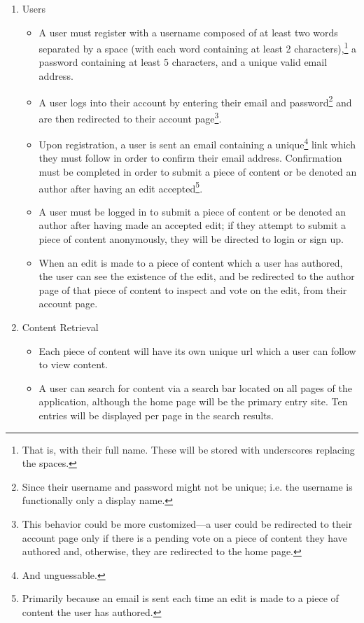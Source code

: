 \documentclass[12pt,letterpaper]{article}
\begin{document}
\begin{enumerate}
\item[] Users
\begin{itemize}
\item A user must register with a username composed of at least two words separated by a space (with each word containing at least 2 characters),\footnote{That is, with their full name. These will be stored with underscores replacing the spaces.} a password containing at least 5 characters, and a unique valid email address.  
\item A user logs into their account by entering their email and password\footnote{Since their username and password might not be unique; i.e. the username is functionally only a display name.} and are then redirected to their account page\footnote{This behavior could be more customized---a user could be redirected to their account page only if there is a pending vote on a piece of content they have authored and, otherwise, they are redirected to the home page.}.
\item Upon registration, a user is sent an email containing a unique\footnote{And unguessable.} link which they must follow in order to confirm their email address. Confirmation must be completed in order to submit a piece of content or be denoted an author after having an edit accepted\footnote{Primarily because an email is sent each time an edit is made to a piece of content the user has authored.}.
\item A user must be logged in to submit a piece of content or be denoted an author after having made an accepted edit; if they attempt to submit a piece of content anonymously, they will be directed to login or sign up. 
\item When an edit is made to a piece of content which a user has authored, the user can see the existence of the edit, and be redirected to the author page of that piece of content to inspect and vote on the edit, from their account page. 
\end{itemize}
\item[] Content Retrieval
\begin{itemize}
\item Each piece of content will have its own unique url which a user can follow to view content. 
\item A user can search for content via a search bar located on all pages of the application, although the home page will be the primary entry site. Ten entries will be displayed per page in the search results. 
\end{itemize}

\end{enumerate}
\end{document}
